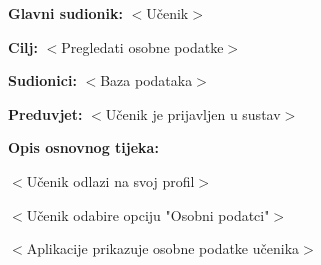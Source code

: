 					\noindent {}
					\begin{packed_item}
	
						\item \textbf{Glavni sudionik: }$<$Učenik$>$
						\item  \textbf{Cilj:} $<$Pregledati osobne podatke$>$
						\item  \textbf{Sudionici:} $<$Baza podataka$>$
						\item  \textbf{Preduvjet:} $<$Učenik je prijavljen u sustav$>$
						\item  \textbf{Opis osnovnog tijeka:}
						
						\item[] \begin{packed_enum}
	
							\item $<$Učenik odlazi na svoj profil$>$
							\item $<$Učenik odabire opciju "Osobni podatci"$>$
							\item $<$Aplikacije prikazuje osobne podatke učenika$>$
						\end{packed_enum}
						
					\end{packed_item}


